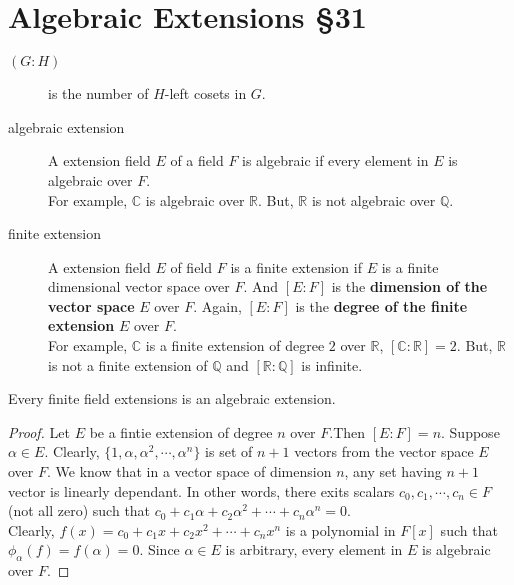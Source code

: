 \section{Algebraic Extensions \S31}
\begin{description}
	\item[$(G : H)$] is the number of $H$-left cosets in $G$.
	\item[algebraic extension] A extension field $E$ of a field $F$ is algebraic if every element in $E$ is algebraic over $F$.\\
		For example, $\mathbb{C}$ is algebraic over $\mathbb{R}$. But, $\mathbb{R}$ is not algebraic over $\mathbb{Q}$.
	\item[finite extension] A extension field $E$ of field $F$ is a finite extension if $E$ is a finite dimensional vector space over $F$. And $[E:F]$ is the \textbf{dimension of the vector space} $E$ over $F$. Again, $[E:F]$ is the \textbf{degree of the finite extension} $E$ over $F$.\\
		For example, $\mathbb{C}$ is a finite extension of degree $2$ over $\mathbb{R}$, $[\mathbb{C} : \mathbb{R}] = 2$. But, $\mathbb{R}$ is not a finite extension of $\mathbb{Q}$ and $[\mathbb{R} : \mathbb{Q}]$ is infinite.
\end{description}

\begin{theorem}
	Every finite field extensions is an algebraic extension.
\end{theorem}
\begin{proof}
	Let $E$ be a fintie extension of degree $n$ over $F$.Then $[E:F] = n$. Suppose $\alpha \in E$. Clearly, $\{1,\alpha,\alpha^2,\cdots,\alpha^n \}$ is set of $n+1$ vectors from the vector space $E$ over $F$. We know that in a vector space of dimension $n$, any set having $n+1$ vector is linearly dependant. In other words, there exits scalars $c_0,c_1,\cdots,c_n \in F$ (not all zero) such that $c_0+c_1\alpha+c_2\alpha^2+\cdots+c_n\alpha^n = 0$.\\

	Clearly, $f(x) = c_0 + c_1x + c_2x^2 + \cdots +c_nx^n$ is a polynomial in $F[x]$ such that $\phi_\alpha(f) = f(\alpha) = 0$. Since $\alpha \in E$ is arbitrary, every element in $E$ is algebraic over $F$.
\end{proof}

